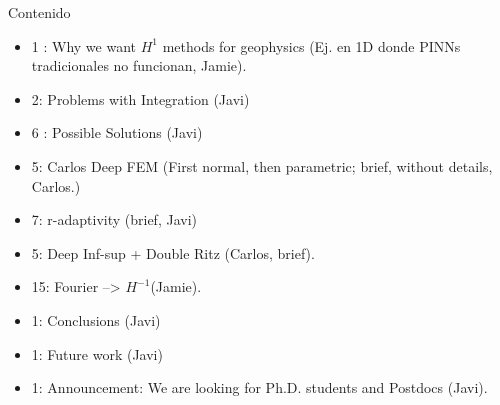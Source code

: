\begin{frame}{Contenido}
\begin{itemize}
\item 1 : Why we want $H^1$ methods for geophysics (Ej. en 1D donde PINNs tradicionales no funcionan, Jamie).
\item 2: Problems with Integration (Javi)
\item 6 : Possible Solutions (Javi)
\item 5: Carlos Deep FEM (First normal, then parametric; brief, without details, Carlos.)
\item 7: r-adaptivity (brief, Javi)
\item 5: Deep Inf-sup + Double Ritz (Carlos, brief).
\item 15: Fourier --> $H^{-1} $(Jamie).
\item 1: Conclusions (Javi)
\item 1: Future work (Javi)
\item 1: Announcement: We are looking for Ph.D. students and Postdocs (Javi).
\end{itemize}

\end{frame}


